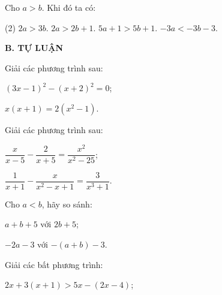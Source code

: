 \begin{exercises}
\begin{questions}[resume=SGK]
        \item Cho $a>b$. Khi đó ta có:
        \begin{tasks}[label=\Alph*.](2)
            \task $2a>3b$.
            \task $2a>2b+1$.
            \task $5a+1>5b+1$.
            \task $-3a<-3b-3$.
        \end{tasks}
    \end{questions}

    \textbf{B. TỰ LUẬN}

    \begin{questions}[resume=SGK]
        \item Giải các phương trình sau:
        \begin{questions}
            \item $(3x-1)^2-(x+2)^2=0$;

            \answerline
            \answerline

            \item $x(x+1)=2(x^2-1)$.

            \answerline
            \answerline
        \end{questions}

        \item Giải các phương trình sau:
        \begin{questions}
            \item $\dfrac{x}{x-5}-\dfrac{2}{x+5}=\dfrac{x^2}{x^2-25}$;

            \answerline
            \answerline
            \answerline

            \item $\dfrac{1}{x+1}-\dfrac{x}{x^2-x+1}=\dfrac{3}{x^3+1}$.

            \answerline
            \answerline
            \answerline
        \end{questions}

        \item Cho $a<b$, hãy so sánh:
        \begin{questions}
            \item $a+b+5$ với $2b+5$;

            \answerline
            \answerline

            \item $-2a-3$ với $-(a+b)-3$.

            \answerline
            \answerline
        \end{questions}

        \item Giải các bất phương trình:
        \begin{questions}
            \item $2x+3(x+1)>5x-(2x-4)$;


\end{questions}
\end{questions}
\end{exercises}
